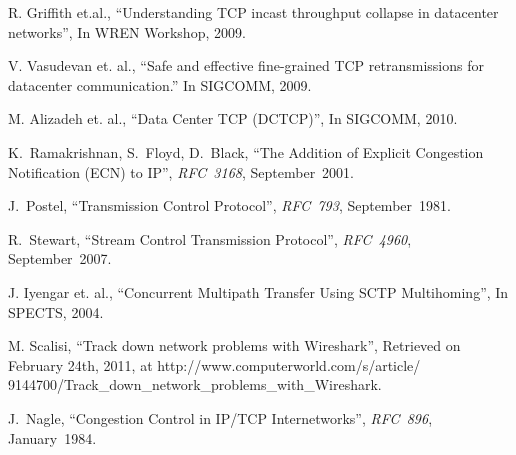 \documentclass[12pt]{article}
\begin{document}
\begin{thebibliography}{9}

R. Griffith et.al.,
  ``Understanding TCP incast throughput collapse in datacenter networks'', 
  In WREN Workshop, 2009.
  
  V. Vasudevan et. al.,
  ``Safe and effective fine-grained TCP retransmissions for datacenter communication.''
 In SIGCOMM, 2009.
 
 M. Alizadeh et. al.,
 ``Data Center TCP (DCTCP)'',
 In SIGCOMM, 2010.
 
  K.~Ramakrishnan, S.~Floyd, D.~Black,
  ``The Addition of Explicit Congestion Notification (ECN) to IP'',
  \textit{RFC~3168},
  September~2001.
 
   J.~Postel,
   ``Transmission Control Protocol'',
   \textit{RFC~793},
   September~1981.
  
 R.~Stewart,
  ``Stream Control Transmission Protocol'',
  \textit{RFC~4960},
 September~2007.
 
 J. Iyengar et. al.,
 ``Concurrent Multipath Transfer Using SCTP Multihoming'',
 In SPECTS, 2004.
 
 M. Scalisi,
 ``Track down network problems with Wireshark'',
  Retrieved on February 24th, 2011, at http://www.computerworld.com/s/article/ 9144700/Track\_down\_network\_problems\_with\_Wireshark.
 
   J.~Nagle,
 ``Congestion Control in IP/TCP Internetworks'',
  \textit{RFC~896},
 January~1984.
 
\end{thebibliography}




\end{document}
